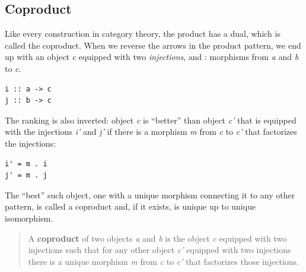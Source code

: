 \subsection{Coproduct}\label{coproduct}

Like every construction in category theory, the product has a dual,
which is called the coproduct. When we reverse the arrows in the product
pattern, we end up with an object \emph{c} equipped with two
\emph{injections},  and : morphisms from \emph{a}
and \emph{b} to \emph{c}.

\begin{verbatim}
i :: a -> c
j :: b -> c
\end{verbatim}

\begin{figure}[H]
  \centering
\end{figure}

\noindent
The ranking is also inverted: object \emph{c} is ``better'' than object
\emph{c'} that is equipped with the injections \emph{i'} and \emph{j'}
if there is a morphism \emph{m} from \emph{c} to \emph{c'} that
factorizes the injections:

\begin{verbatim}
i' = m . i
j' = m . j
\end{verbatim}

\begin{figure}[H]
  \centering
\end{figure}

\noindent
The ``best'' such object, one with a unique morphism connecting it to
any other pattern, is called a coproduct and, if it exists, is unique up
to unique isomorphism.

\begin{quote}
A \textbf{coproduct} of two objects \emph{a} and \emph{b} is the object
\emph{c} equipped with two injections such that for any other object
\emph{c'} equipped with two injections there is a unique morphism
\emph{m} from \emph{c} to \emph{c'} that factorizes those injections.
\end{quote}

